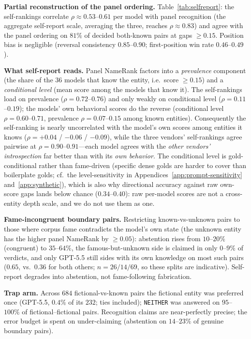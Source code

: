 \textbf{Partial reconstruction of the panel ordering.} Table~\ref{tab:selfreport}: the self-rankings correlate $\rho \approx 0.53$--$0.61$ per model with panel recognition (the aggregate self-report scale, averaging the three, reaches $\rho \approx 0.83$) and agree with the panel ordering on $81\%$ of decided both-known pairs at gaps $\ge 0.15$. Position bias is negligible (reversal consistency $0.85$--$0.90$; first-position win rate $0.46$--$0.49$).

\textbf{What self-report reads.} Panel NameRank factors into a \emph{prevalence} component (the share of the $36$ models that know the entity, i.e.\ score $\ge 0.15$) and a \emph{conditional level} (mean score among the models that know it). The self-rankings load on prevalence ($\rho = 0.72$--$0.76$) and only weakly on conditional level ($\rho = 0.11$--$0.19$); the models' own behavioral scores do the reverse (conditional level $\rho = 0.60$--$0.71$, prevalence $\rho = 0.07$--$0.15$ among known entities). Consequently the self-ranking is nearly uncorrelated with the model's own scores among entities it knows ($\rho = +0.04$ / $-0.06$ / $-0.09$), while the three vendors' self-rankings agree pairwise at $\rho = 0.90$--$0.91$---each model agrees with the \emph{other vendors' introspection} far better than with its \emph{own behavior}. The conditional level is gold-conditional rather than fame-driven (specific dense golds are harder to cover than boilerplate golds; cf.\ the level-sensitivity in Appendices~\ref{app:prompt-sensitivity} and~\ref{app:synthetic}), which is also why directional accuracy against raw own-score gaps lands below chance ($0.34$--$0.40$): raw per-model scores are not a cross-entity depth scale, and we do not use them as one.

\textbf{Fame-incongruent boundary pairs.} Restricting known-vs-unknown pairs to those where corpus fame contradicts the model's own state (the unknown entity has the higher panel NameRank by $\ge 0.05$): abstention rises from $10$--$20\%$ (congruent) to $35$--$64\%$, the famous-but-unknown side is claimed in only $0$--$9\%$ of verdicts, and only GPT-5.5 still sides with its own knowledge on most such pairs ($0.65$, vs.\ $0.36$ for both others; $n = 26/14/69$, so these splits are indicative). Self-report degrades into abstention, not fame-following fabrication.

\textbf{Trap arm.} Across $684$ fictional-vs-known pairs the fictional entity was preferred once (GPT-5.5, $0.4\%$ of its $232$; ties included); \texttt{NEITHER} was answered on $95$--$100\%$ of fictional--fictional pairs. Recognition claims are near-perfectly precise; the error budget is spent on under-claiming (abstention on $14$--$23\%$ of genuine boundary pairs).

